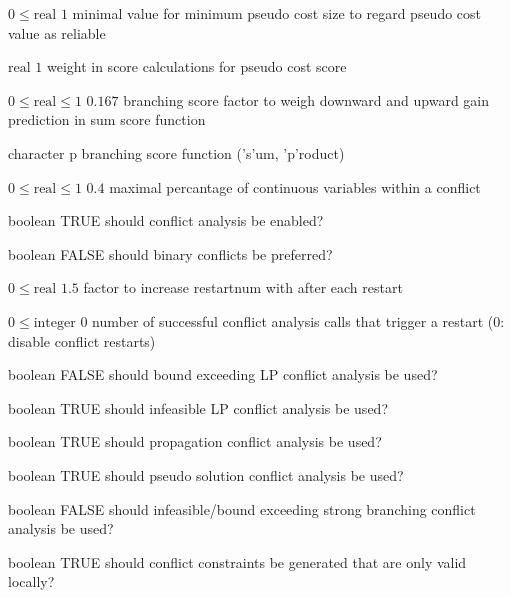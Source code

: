 %
{$0\leq\textrm{real}$}%
{$1$}%
{minimal value for minimum pseudo cost size to regard pseudo cost value as reliable}%
{}

%
{$\textrm{real}$}%
{$1$}%
{weight in score calculations for pseudo cost score}%
{}

%
{$0\leq\textrm{real}\leq1$}%
{$0.167$}%
{branching score factor to weigh downward and upward gain prediction in sum score function}%
{}

%
{character}%
{p}%
{branching score function ('s'um, 'p'roduct)}%
{}

%
{$0\leq\textrm{real}\leq1$}%
{$0.4$}%
{maximal percantage of continuous variables within a conflict}%
{}

%
{boolean}%
{TRUE}%
{should conflict analysis be enabled?}%
{}

%
{boolean}%
{FALSE}%
{should binary conflicts be preferred?}%
{}

%
{$0\leq\textrm{real}$}%
{$1.5$}%
{factor to increase restartnum with after each restart}%
{}

%
{$0\leq\textrm{integer}$}%
{$0$}%
{number of successful conflict analysis calls that trigger a restart (0: disable conflict restarts)}%
{}

%
{boolean}%
{FALSE}%
{should bound exceeding LP conflict analysis be used?}%
{}

%
{boolean}%
{TRUE}%
{should infeasible LP conflict analysis be used?}%
{}

%
{boolean}%
{TRUE}%
{should propagation conflict analysis be used?}%
{}

%
{boolean}%
{TRUE}%
{should pseudo solution conflict analysis be used?}%
{}

%
{boolean}%
{FALSE}%
{should infeasible/bound exceeding strong branching conflict analysis be used?}%
{}

%
{boolean}%
{TRUE}%
{should conflict constraints be generated that are only valid locally?}%
{}

